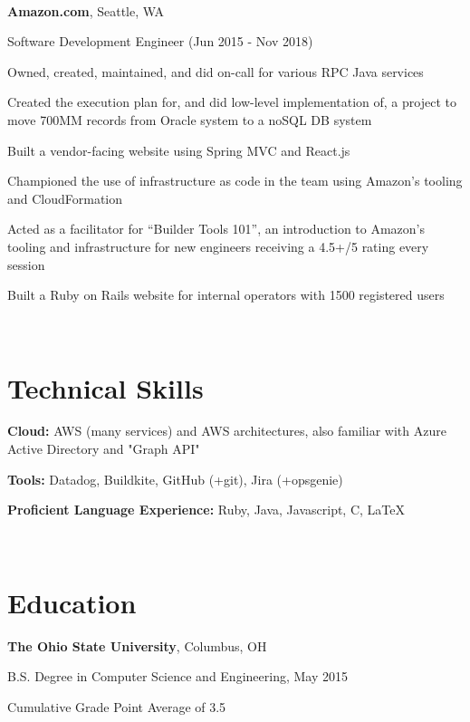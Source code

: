 \documentclass[letterpaper]{resume}
\begin{document}
~

\textbf{Amazon.com}, Seattle, WA

Software Development Engineer (Jun 2015 - Nov 2018)

\begin{compactitem}
\item Owned, created, maintained, and did on-call for various RPC Java services
\item Created the execution plan for, and did low-level implementation of, a
    project to move 700MM records from Oracle system to a noSQL DB
    system
\item Built a vendor-facing website using Spring MVC and React.js
\item Championed the use of infrastructure as code in the team using
    Amazon's tooling and CloudFormation
\item Acted as a facilitator for ``Builder Tools 101'', an introduction to
    Amazon's tooling and infrastructure for new engineers receiving a 4.5+/5 rating every session
\item Built a Ruby on Rails website for internal operators with 1500 registered users
\end{compactitem}

~


\section{Technical Skills}

\begin{compactitem}
\item
	\textbf{Cloud:}
    AWS (many services) and AWS architectures, also familiar with Azure Active
    Directory and "Graph API"

\item
    \textbf{Tools:}
    Datadog, Buildkite, GitHub (+git), Jira (+opsgenie)

\item
	\textbf{Proficient Language Experience:}
    Ruby, Java, Javascript, C, \LaTeX

\end{compactitem}

~

\section{Education}
\textbf{The Ohio State University}, Columbus, OH
\begin{compactitem}
\item B.S. Degree in Computer Science and Engineering, May 2015
\item Cumulative Grade Point Average of 3.5
\end{compactitem}
\end{document}
